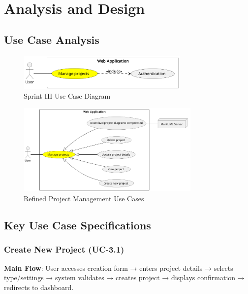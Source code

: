 \section{Analysis and Design}

\subsection{Use Case Analysis}

\begin{figure}[H]
\centering
\includegraphics[width=0.75\textwidth]{conception/SprintIII/use_case_diagrams/use_case_diagram_of_SprintIII.png}
\caption{Sprint III Use Case Diagram}
\label{fig:use_case_sprint3}
\end{figure}

\begin{figure}[H]
\centering
\includegraphics[width=0.8\textwidth]{conception/SprintIII/use_case_diagrams/refined_use_case_feature_project_management.png}
\caption{Refined Project Management Use Cases}
\label{fig:refined_use_case_project_mgmt}
\end{figure}

\subsection{Key Use Case Specifications}

\subsubsection{Create New Project (UC-3.1)}
\textbf{Main Flow}: User accesses creation form → enters project details → selects type/settings → system validates → creates project → displays confirmation → redirects to dashboard.

